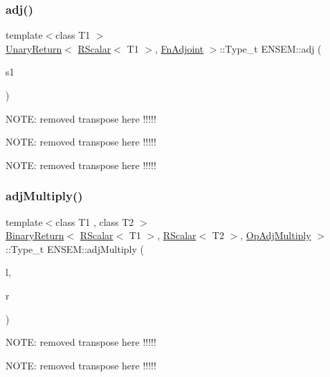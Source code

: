 \subsubsection{\texorpdfstring{adj()}{adj()}}
{\footnotesize\ttfamily template$<$class T1 $>$ \\
\mbox{\hyperlink{structENSEM_1_1UnaryReturn}{Unary\+Return}}$<$ \mbox{\hyperlink{classENSEM_1_1RScalar}{R\+Scalar}}$<$ T1 $>$, \mbox{\hyperlink{structENSEM_1_1FnAdjoint}{Fn\+Adjoint}} $>$\+::Type\+\_\+t E\+N\+S\+E\+M\+::adj (\begin{DoxyParamCaption}\item[{const \mbox{\hyperlink{classENSEM_1_1RScalar}{R\+Scalar}}$<$ T1 $>$ \&}]{s1 }\end{DoxyParamCaption})\hspace{0.3cm}{\ttfamily [inline]}}

N\+O\+TE\+: removed transpose here !!!!!

N\+O\+TE\+: removed transpose here !!!!!

N\+O\+TE\+: removed transpose here !!!!! \mbox{\label{group__rscalar_gaed3e42d4304edfd5a3838b8b1b559e37}} 
\subsubsection{\texorpdfstring{adjMultiply()}{adjMultiply()}}
{\footnotesize\ttfamily template$<$class T1 , class T2 $>$ \\
\mbox{\hyperlink{structENSEM_1_1BinaryReturn}{Binary\+Return}}$<$ \mbox{\hyperlink{classENSEM_1_1RScalar}{R\+Scalar}}$<$ T1 $>$, \mbox{\hyperlink{classENSEM_1_1RScalar}{R\+Scalar}}$<$ T2 $>$, \mbox{\hyperlink{structENSEM_1_1OpAdjMultiply}{Op\+Adj\+Multiply}} $>$\+::Type\+\_\+t E\+N\+S\+E\+M\+::adj\+Multiply (\begin{DoxyParamCaption}\item[{const \mbox{\hyperlink{classENSEM_1_1RScalar}{R\+Scalar}}$<$ T1 $>$ \&}]{l,  }\item[{const \mbox{\hyperlink{classENSEM_1_1RScalar}{R\+Scalar}}$<$ T2 $>$ \&}]{r }\end{DoxyParamCaption})\hspace{0.3cm}{\ttfamily [inline]}}

N\+O\+TE\+: removed transpose here !!!!!

N\+O\+TE\+: removed transpose here !!!!!

